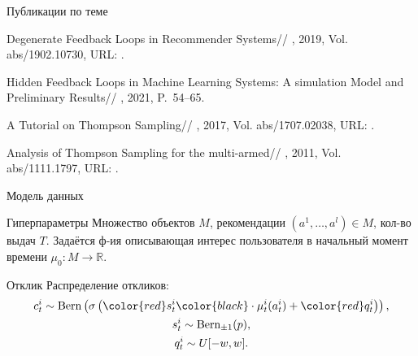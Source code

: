 \documentclass{beamer}
\begin{document}
\begin{frame}{Публикации по теме}
\begin{thebibliography}{4}
    Degenerate Feedback Loops in Recommender Systems//
    , 2019, Vol. abs/1902.10730,
	  URL: .

    Hidden Feedback Loops in Machine Learning Systems: A simulation Model and Preliminary Results//
    , 2021, P.~54--65.

    A Tutorial on Thompson Sampling//
    , 2017, Vol. abs/1707.02038,
	  URL: .

    Analysis of Thompson Sampling for the multi-armed//
    , 2011, Vol. abs/1111.1797,
	  URL: .

\end{thebibliography}
\end{frame}
\begin{frame}{Модель данных}
  \begin{block}{Гиперпараметры}
  Множество объектов $M$, рекомендации $(a^1, \dots, a^l) \in M$, кол-во выдач $T$.
  Задаётся ф-ия описывающая интерес пользователя  в начальный момент времени $\mu_0 : M \to \mathbb{R}$.
\end{block}
\begin{block}{Отклик}  
  Распределение откликов:   \begin{gather*}
    c_t^i \sim \text{Bern} \left(\sigma\left( \color{red} s_t^i \color{black} \cdot \mu_t^i (a_t^i) + \mathbin{\color{red} q_t^i } \right) \right), \\ 
    s_t^i \sim \text{Bern}_{\pm 1}(p), \\ q_t^i \sim U[-w, w].
  \end{gather*}
\end{block}
\end{frame}
\end{document}
